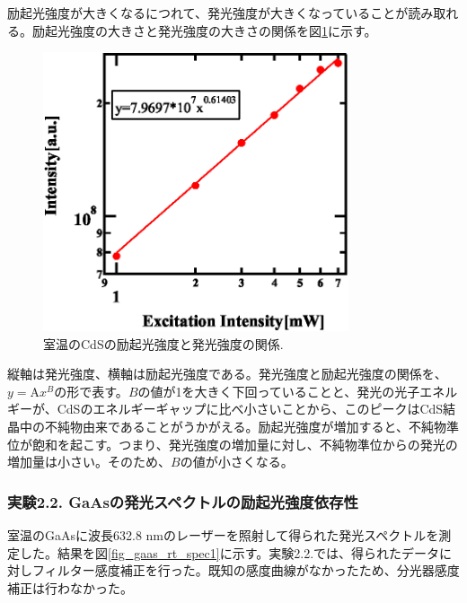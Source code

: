\documentclass[11pt,a4j]{jsarticle}
\begin{document}

励起光強度が大きくなるにつれて、発光強度が大きくなっていることが読み取れる。励起光強度の大きさと発光強度の大きさの関係を図\ref{fig_cds_imp_int1}に示す。

\newpage

\begin{figure}[ht]
 \centering
 \includegraphics[clip,width=9cm]{start2_CdS_imp_Int.eps}
 \caption{室温のCdSの励起光強度と発光強度の関係.}
 \label{fig_cds_imp_int1}
\end{figure}

縦軸は発光強度、横軸は励起光強度である。発光強度と励起光強度の関係を、$y=\mathrm{A}x^{B}$の形で表す。$B$の値が1を大きく下回っていることと、発光の光子エネルギーが、CdSのエネルギーギャップに比べ小さいことから、このピークはCdS結晶中の不純物由来であることがうかがえる。励起光強度が増加すると、不純物準位が飽和を起こす。つまり、発光強度の増加量に対し、不純物準位からの発光の増加量は小さい。そのため、$B$の値が小さくなる。

\newpage
\subsubsection{実験2.2. GaAsの発光スペクトルの励起光強度依存性}

室温のGaAsに波長632.8 nmのレーザーを照射して得られた発光スペクトルを測定した。結果を図\ref{fig_gaas_rt_spec1}に示す。実験2.2.では、得られたデータに対しフィルター感度補正を行った。既知の感度曲線がなかったため、分光器感度補正は行わなかった。
\end{document}
